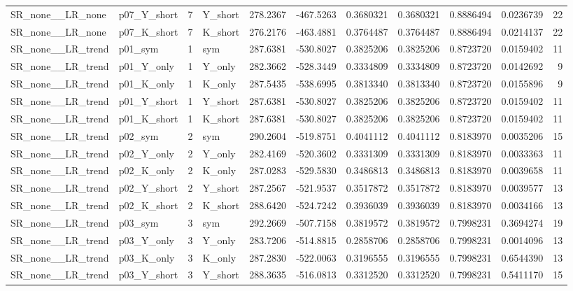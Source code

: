 \begin{table}[!h]
\begin{tabular}[t]{llrlrrrrrrr}
SR\_none\_\_LR\_none & p07\_Y\_short & 7 & Y\_short & 278.2367 & -467.5263 & 0.3680321 & 0.3680321 & 0.8886494 & 0.0236739 & 22\\
SR\_none\_\_LR\_none & p07\_K\_short & 7 & K\_short & 276.2176 & -463.4881 & 0.3764487 & 0.3764487 & 0.8886494 & 0.0214137 & 22\\
\addlinespace
SR\_none\_\_LR\_trend & p01\_sym & 1 & sym & 287.6381 & -530.8027 & 0.3825206 & 0.3825206 & 0.8723720 & 0.0159402 & 11\\
SR\_none\_\_LR\_trend & p01\_Y\_only & 1 & Y\_only & 282.3662 & -528.3449 & 0.3334809 & 0.3334809 & 0.8723720 & 0.0142692 & 9\\
SR\_none\_\_LR\_trend & p01\_K\_only & 1 & K\_only & 287.5435 & -538.6995 & 0.3813340 & 0.3813340 & 0.8723720 & 0.0155896 & 9\\
SR\_none\_\_LR\_trend & p01\_Y\_short & 1 & Y\_short & 287.6381 & -530.8027 & 0.3825206 & 0.3825206 & 0.8723720 & 0.0159402 & 11\\
SR\_none\_\_LR\_trend & p01\_K\_short & 1 & K\_short & 287.6381 & -530.8027 & 0.3825206 & 0.3825206 & 0.8723720 & 0.0159402 & 11\\
\addlinespace
SR\_none\_\_LR\_trend & p02\_sym & 2 & sym & 290.2604 & -519.8751 & 0.4041112 & 0.4041112 & 0.8183970 & 0.0035206 & 15\\
SR\_none\_\_LR\_trend & p02\_Y\_only & 2 & Y\_only & 282.4169 & -520.3602 & 0.3331309 & 0.3331309 & 0.8183970 & 0.0033363 & 11\\
SR\_none\_\_LR\_trend & p02\_K\_only & 2 & K\_only & 287.0283 & -529.5830 & 0.3486813 & 0.3486813 & 0.8183970 & 0.0039658 & 11\\
SR\_none\_\_LR\_trend & p02\_Y\_short & 2 & Y\_short & 287.2567 & -521.9537 & 0.3517872 & 0.3517872 & 0.8183970 & 0.0039577 & 13\\
SR\_none\_\_LR\_trend & p02\_K\_short & 2 & K\_short & 288.6420 & -524.7242 & 0.3936039 & 0.3936039 & 0.8183970 & 0.0034166 & 13\\
\addlinespace
SR\_none\_\_LR\_trend & p03\_sym & 3 & sym & 292.2669 & -507.7158 & 0.3819572 & 0.3819572 & 0.7998231 & 0.3694274 & 19\\
SR\_none\_\_LR\_trend & p03\_Y\_only & 3 & Y\_only & 283.7206 & -514.8815 & 0.2858706 & 0.2858706 & 0.7998231 & 0.0014096 & 13\\
SR\_none\_\_LR\_trend & p03\_K\_only & 3 & K\_only & 287.2830 & -522.0063 & 0.3196555 & 0.3196555 & 0.7998231 & 0.6544390 & 13\\
SR\_none\_\_LR\_trend & p03\_Y\_short & 3 & Y\_short & 288.3635 & -516.0813 & 0.3312520 & 0.3312520 & 0.7998231 & 0.5411170 & 15\\

\end{tabular}
\end{table}
